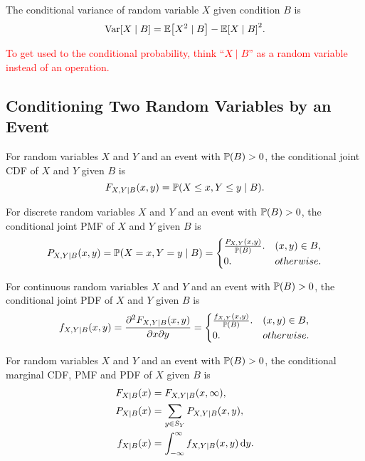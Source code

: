 \begin{theorem}
    The conditional variance of random variable $X$ given condition $B$ is
    \[\Var[X\mid B]=\E{X^2\mid B}-\E{X\mid B}^2.\]
\end{theorem}

\textcolor{red}{To get used to the conditional probability, think ``$X\mid B$'' as a random variable instead of an operation.}

\subsection{Conditioning Two Random Variables by an Event}
\begin{definition}
    For random variables $X$ and $Y$ and an event with $\P{B}>0$, the conditional joint \textnormal{CDF} of $X$ and $Y$ given $B$ is
    \[F_{X,Y\mid B}(x,y)=\P{X\leq x,Y\leq y\mid B}.\]
\end{definition}

\begin{definition}
    For discrete random variables $X$ and $Y$ and an event with $\P{B}>0$, the conditional joint \textnormal{PMF} of $X$ and $Y$ given $B$ is
    \[P_{X,Y\mid B}(x,y)=\P{X=x,Y=y\mid B}={
        \begin{cases}
            \frac{P_{X,Y}(x,y)}{\P{B}}. & (x,y)\in B, \\
            0. & otherwise.
        \end{cases}
    }\]
\end{definition}

\begin{definition}
    For continuous random variables $X$ and $Y$ and an event with $\P{B}>0$, the conditional joint \textnormal{PDF} of $X$ and $Y$ given $B$ is
    \[f_{X,Y\mid B}(x,y)=\frac{\partial^2 F_{X,Y\mid B}(x,y)}{\partial x\partial y}={
        \begin{cases}
            \frac{f_{X,Y}(x,y)}{\P{B}}. & (x,y)\in B, \\
            0. & otherwise.
        \end{cases}
    }\]
\end{definition}

\begin{definition}
    For random variables $X$ and $Y$ and an event with $\P{B}>0$, the conditional marginal \textnormal{CDF}, \textnormal{PMF} and \textnormal{PDF} of $X$ given $B$ is
    \begin{align*}
        F_{X\mid B}(x)&=F_{X,Y\mid B}(x,\infty), \\
        P_{X\mid B}(x)&=\sum_{y\in S_Y}P_{X,Y\mid B}(x,y), \\
        f_{X\mid B}(x)&=\int_{-\infty}^{\infty}f_{X,Y\mid B}(x,y)\diff y.
    \end{align*}
\end{definition}

